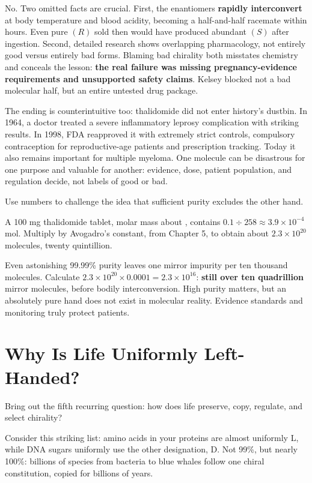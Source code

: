 No. Two omitted facts are crucial. First, the enantiomers \textbf{rapidly interconvert} at body temperature and blood acidity, becoming a half-and-half racemate within hours. Even pure $(R)$ sold then would have produced abundant $(S)$ after ingestion. Second, detailed research shows overlapping pharmacology, not entirely good versus entirely bad forms. Blaming bad chirality both misstates chemistry and conceals the lesson: \textbf{the real failure was missing pregnancy-evidence requirements and unsupported safety claims}. Kelsey blocked not a bad molecular half, but an entire untested drug package.

The ending is counterintuitive too: thalidomide did not enter history's dustbin. In 1964, a doctor treated a severe inflammatory leprosy complication with striking results. In 1998, FDA reapproved it with extremely strict controls, compulsory contraception for reproductive-age patients and prescription tracking. Today it also remains important for multiple myeloma. One molecule can be disastrous for one purpose and valuable for another: evidence, dose, patient population, and regulation decide, not labels of good or bad.

\begin{qiaoliang}
Use numbers to challenge the idea that sufficient purity excludes the other hand.

A 100 mg thalidomide tablet, molar mass about , contains $0.1\div258\approx3.9\times10^{-4}$ mol. Multiply by Avogadro's constant,  from Chapter 5, to obtain about $2.3\times10^{20}$ molecules, twenty quintillion.

Even astonishing 99.99\% purity leaves one mirror impurity per ten thousand molecules. Calculate $2.3\times10^{20}\times0.0001=2.3\times10^{16}$: \textbf{still over ten quadrillion} mirror molecules, before bodily interconversion. High purity matters, but an absolutely pure hand does not exist in molecular reality. Evidence standards and monitoring truly protect patients.
\end{qiaoliang}

\section{Why Is Life Uniformly Left-Handed?}

Bring out the fifth recurring question: how does life preserve, copy, regulate, and select chirality?

Consider this striking list: amino acids in your proteins are almost uniformly L, while DNA sugars uniformly use the other designation, D. Not 99\%, but nearly 100\%: billions of species from bacteria to blue whales follow one chiral constitution, copied for billions of years.

